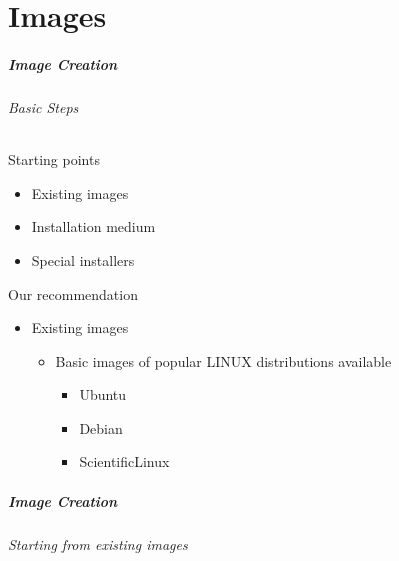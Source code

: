 \part{Images}

\begin{frame}
\frametitle{Image Creation}
\framesubtitle{Basic Steps}
Starting points
\begin{itemize}
\item Existing images
\item Installation medium
\item Special installers
\end{itemize}
Our recommendation
\begin{itemize}
\item Existing images
  \begin{itemize}
  \item Basic images of popular LINUX distributions available
    \begin{itemize}
    \item Ubuntu
    \item Debian
    \item ScientificLinux
    \end{itemize}
  \end{itemize}
\end{itemize}
\end{frame}

\begin{frame}
\frametitle{Image Creation}
\framesubtitle{Starting from existing images}


\end{frame}

